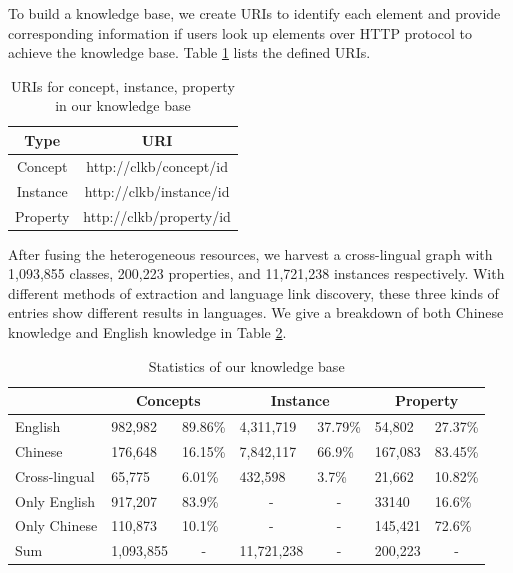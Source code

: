 \documentclass[runningheads,a4paper]{llncs}
\begin{document}
To build a knowledge base, we create URIs to identify each element and provide corresponding information if users look up elements over HTTP protocol to achieve the knowledge base. Table \ref{tab:uris} lists the defined URIs.
\begin{table}[h]
\small
\centering
\caption{URIs for concept, instance, property in our knowledge base}
\label{tab:uris}
    \begin{tabular}{|c|c|}
        \hline
        Type     & URI                     \\ \hline
        Concept  & http://clkb/concept/id  \\ \hline
        Instance & http://clkb/instance/id \\ \hline
        Property & http://clkb/property/id \\ \hline
    \end{tabular}
\end{table}

After fusing the heterogeneous resources, we harvest a cross-lingual graph with 1,093,855 classes, 200,223 properties, and 11,721,238 instances respectively. With different methods of extraction and language link discovery, these three kinds of entries show different results in languages. We give a breakdown of both Chinese knowledge and English knowledge in Table \ref{tab:kb-result}.

\begin{table}[h]
\small
\centering
\caption{Statistics of our knowledge base}
\label{tab:kb-result}
\begin{tabular}{|l|l|l|l|l|l|l|}
\hline
\multicolumn{1}{|c|}{} & \multicolumn{2}{c|}{Concepts}      & \multicolumn{2}{c|}{Instance}                   & \multicolumn{2}{c|}{Property}    \\ \hline
English                & 982,982   & 89.86\%                & 4,311,719              & 37.79\%                & 54,802  & 27.37\%                \\ \hline
Chinese                & 176,648   & 16.15\%                & 7,842,117              & 66.9\%                 & 167,083 & 83.45\%                \\ \hline
Cross-lingual          & 65,775    & 6.01\%                 & 432,598                & 3.7\%                  & 21,662  & 10.82\%                \\ \hline
Only English           & 917,207   & 83.9\%                 & \multicolumn{1}{c|}{-} & \multicolumn{1}{c|}{-} & 33140   & 16.6\%                 \\ \hline
Only Chinese           & 110,873   & 10.1\%                 & \multicolumn{1}{c|}{-} & \multicolumn{1}{c|}{-} & 145,421 & 72.6\%                 \\ \hline
Sum                    & 1,093,855 & \multicolumn{1}{c|}{-} & 11,721,238             & \multicolumn{1}{c|}{-} & 200,223 & \multicolumn{1}{c|}{-} \\ \hline
\end{tabular}
\end{table}
\end{document}

